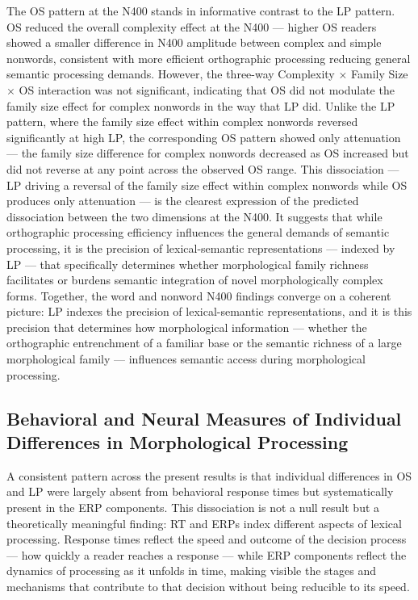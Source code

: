 \documentclass[utf8]{FrontiersinHarvard} %
\begin{document}
	The OS pattern at the N400 stands in informative contrast to the LP pattern. OS reduced the overall complexity effect at the N400 --- higher OS readers showed a smaller difference in N400 amplitude between complex and simple nonwords, consistent with more efficient orthographic processing reducing general semantic processing demands. However, the three-way Complexity $\times$ Family Size $\times$ OS interaction was not significant, indicating that OS did not modulate the family size effect for complex nonwords in the way that LP did. Unlike the LP pattern, where the family size effect within complex nonwords reversed significantly at high LP, the corresponding OS pattern showed only attenuation --- the family size difference for complex nonwords decreased as OS increased but did not reverse at any point across the observed OS range. This dissociation --- LP driving a reversal of the family size effect within complex nonwords while OS produces only attenuation --- is the clearest expression of the predicted dissociation between the two dimensions at the N400. It suggests that while orthographic processing efficiency influences the general demands of semantic processing, it is the precision of lexical-semantic representations --- indexed by LP --- that specifically determines whether morphological family richness facilitates or burdens semantic integration of novel morphologically complex forms. Together, the word and nonword N400 findings converge on a coherent picture: LP indexes the precision of lexical-semantic representations, and it is this precision that determines how morphological information --- whether the orthographic entrenchment of a familiar base or the semantic richness of a large morphological family --- influences semantic access during morphological processing.
	
	\subsection{Behavioral and Neural Measures of Individual Differences in Morphological Processing}

	A consistent pattern across the present results is that individual differences in OS and LP were largely absent from behavioral response times but systematically present in the ERP components. This dissociation is not a null result but a theoretically meaningful finding: RT and ERPs index different aspects of lexical processing. Response times reflect the speed and outcome of the decision process --- how quickly a reader reaches a response --- while ERP components reflect the dynamics of processing as it unfolds in time, making visible the stages and mechanisms that contribute to that decision without being reducible to its speed.
	
\end{document}
